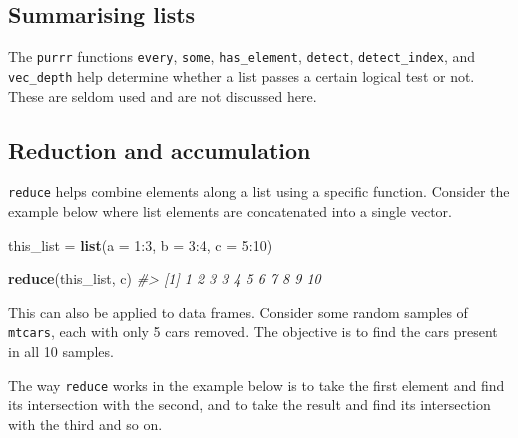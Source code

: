 \documentclass[]{book}
\newenvironment{Shaded}{}{}
\newcommand{\CommentTok}[1]{\textcolor[rgb]{0.38,0.63,0.69}{\textit{#1}}}
\newcommand{\ControlFlowTok}[1]{\textcolor[rgb]{0.00,0.44,0.13}{\textbf{#1}}}
\newcommand{\DataTypeTok}[1]{\textcolor[rgb]{0.56,0.13,0.00}{#1}}
\newcommand{\DecValTok}[1]{\textcolor[rgb]{0.25,0.63,0.44}{#1}}
\newcommand{\KeywordTok}[1]{\textcolor[rgb]{0.00,0.44,0.13}{\textbf{#1}}}
\newcommand{\NormalTok}[1]{#1}
\newcommand{\OperatorTok}[1]{\textcolor[rgb]{0.40,0.40,0.40}{#1}}
\newcommand{\StringTok}[1]{\textcolor[rgb]{0.25,0.44,0.63}{#1}}
\begin{document}
\begin{Shaded}
\end{Shaded}

\hypertarget{summarising-lists}{%
\subsection{Summarising lists}\label{summarising-lists}}

The \texttt{purrr} functions \texttt{every}, \texttt{some}, \texttt{has\_element}, \texttt{detect}, \texttt{detect\_index}, and \texttt{vec\_depth} help determine whether a list passes a certain logical test or not. These are seldom used and are not discussed here.

\hypertarget{reduction-and-accumulation}{%
\subsection{Reduction and accumulation}\label{reduction-and-accumulation}}

\texttt{reduce} helps combine elements along a list using a specific function. Consider the example below where list elements are concatenated into a single vector.

\begin{Shaded}
\begin{Highlighting}[]
\NormalTok{this_list =}\StringTok{ }\KeywordTok{list}\NormalTok{(}\DataTypeTok{a =} \DecValTok{1}\OperatorTok{:}\DecValTok{3}\NormalTok{, }\DataTypeTok{b =} \DecValTok{3}\OperatorTok{:}\DecValTok{4}\NormalTok{, }\DataTypeTok{c =} \DecValTok{5}\OperatorTok{:}\DecValTok{10}\NormalTok{)}

\KeywordTok{reduce}\NormalTok{(this_list, c)}
\CommentTok{#>  [1]  1  2  3  3  4  5  6  7  8  9 10}
\end{Highlighting}
\end{Shaded}

This can also be applied to data frames. Consider some random samples of \texttt{mtcars}, each with only 5 cars removed. The objective is to find the cars present in all 10 samples.

The way \texttt{reduce} works in the example below is to take the first element and find its intersection with the second, and to take the result and find its intersection with the third and so on.
\end{document}
